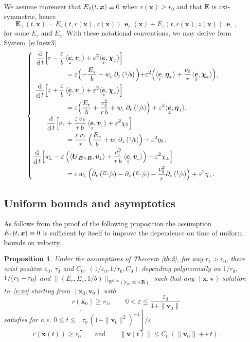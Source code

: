 \documentclass[JEP,XML,SOM,Unicode]{cedram}
\newenvironment{splitcases}
{\begin{cases}\begin{aligned}}
{\end{aligned}\end{cases}}
\newcommand{\sperp}{{\scriptscriptstyle\perp}}
\let\eps\varepsilon
\let\d\partial
\DeclareMathOperator\dD{d}\let\dd\dD
\theoremstyle{plain}
\newtheorem{proposition}[theorem]{Proposition}
\theoremstyle{definition}
\newcommand{\be}{\begin{equation}}
\newcommand{\ee}{\end{equation}}
\newcommand{\bpr}{\begin{proposition}}
\newcommand{\epr}{\end{proposition}}
\newcommand\R{\mathbf R}
\newcommand\bB{{\boldsymbol B}}
\newcommand\bE{{\boldsymbol E}}
\newcommand\bU{{\boldsymbol U}}
\newcommand\bfv{{\boldsymbol v}}
\newcommand\bfx{{\boldsymbol x}}
\newcommand\bfeta{{\boldsymbol \eta}}
\newcommand\bfchi{{\boldsymbol \chi}}
\DeclareMathOperator{\beD}{\boldsymbol{e}}
\newcommand\eDr{\beD_r}
\newcommand\eDz{\beD_z}
\newcommand\eDpar{\beD_\mypar}
\newcommand\vpar{v_\mypar}
\newcommand\bvperp{\bfv_{\!\sperp}}
\newcommand\eperp{w_{\!\sperp}}
\newcommand\Epar{E_\mypar}
\newcommand\Eperp{\bE_{\!\sperp}}
\newcommand\Er{E_r}
\newcommand\Ez{E_z}
\newcommand{\EcB}{\bU_{\bE\times\bB}}
\newcommand{\mypar}{{\mkern3mu\vphantom{\perp}\vrule depth 0pt\mkern2mu\vrule depth 0pt\mkern3mu}}
\begin{document}
We assume moreover that $\Epar(t,\bfx)\equiv 0$ when $r(\bfx)\geq r_0$ and that $\bE$ is axi-symmetric, hence
\[
\Eperp(t,\bfx)=\Er(t,r(\bfx),z(\bfx))\,\eDr(\bfx)+\Ez(t,r(\bfx),z(\bfx))\,\eDz,
\]
for some $\Er$ and $\Ez$. With these notational conventions, we may derive from System~\eqref{e:1new3}
\be
\label{e:rzve}
\begin{splitcases}
\frac{\dD}{\dD t}\Bigl[r
-\frac{\eps}{b}\,&\langle\eDz,\bvperp\rangle
+\eps^2\langle\eDr,\bfchi_x\rangle\Bigr]\\
&=
\eps\Bigl(-\frac{\Ez}{b}-\eperp\,\d_z\left(\sfrac1b\right)\Bigl)
+\eps^2\Bigl(\langle\eDr,\bfeta_x\rangle+\frac{\vpar}{r}\langle\eDpar,\bfchi_x\rangle\Bigr),\\
\frac{\dD}{\dD t}\Bigl[z
+\frac{\eps}{b}\,&\langle\eDr,\bvperp\rangle
+\eps^2\langle\eDz,\bfchi_x\rangle\Bigr]\\
&=
\eps\Bigl(\frac{\Er}{b}+\frac{\vpar^2}{r\,b}
+\eperp\,\d_r\left(\sfrac1b\right)\Bigr)
+\eps^2\langle\eDz,\bfeta_x\rangle,\\
\frac{\dD }{\dD t}\Bigl[\vpar
&+\frac{\eps\,\vpar}{r\,b}
\,\langle\eDz,\bvperp\rangle
+\eps^2\chi_\mypar\Bigr]\\
&=
\frac{\eps\,\vpar}{r}\,\Bigl(\frac{\Ez}{b}
+\eperp\d_z\left(\sfrac1b\right)\Bigr)+\eps^2\eta_\mypar,\\
\frac{\dD }{\dD t}\Bigl[\eperp
-\eps\,
&\Bigl(\langle\EcB,\bvperp\rangle
+\frac{\vpar^2}{r\,b}
\,\langle\eDz,\bvperp\rangle
\Bigr)
+\eps^2\chi_\sperp\Bigr]\\
&=
\eps\,\eperp\,
\Bigl(\d_r\left(\sfrac{\Ez}{b}\right)-\d_z\left(\sfrac{\Er}{b}\right)
-\frac{\vpar^2}{r}\d_z\left(\sfrac1b\right)\Bigr)
+\eps^2\eta_\sperp.
\end{splitcases}
\ee

\subsection{Uniform bounds and asymptotics}

As follows from the proof of the following proposition the assumption $\Epar(t,\bfx)\equiv 0$ is sufficient by itself to improve the dependence on time of uniform bounds on velocity.

\bpr
Under the assumptions of Theorem \ref{th:2}, for any $r_1>r_0$, there exist positive $\eps_0$, $\tau_0$ and $C_0$, $(1/\eps_0,1/\tau_0,C_0)$ depending polynomially on $1/r_0$, $1/(r_1-\nobreak r_0)$ and $\|(\Er,\Ez,1/b)\|_{W^{2,\infty}([r_0,\infty[\times\R)}$ such that any $(\bfx,\bfv)$ solution to~\eqref{e:xv} starting from $(\bfx_0,\bfv_0)$ with
\[
r(\bfx_0)\geq r_1,\qquad
0<\eps\leq \frac{\eps_0}{1+\|\bfv_0\|}
\]
satisfies for a.e. $0\leq t\leq[\tau_0\,(1+\|\bfv_0\|^2)^{-1}]/\eps$
\[
r(\bfx(t))\geq r_0\qquad\textrm{and}\qquad
\|\bfv(t)\|\leq C_0\,(\|\bfv_0\|+\eps\,t).
\]
\epr
\end{document}
